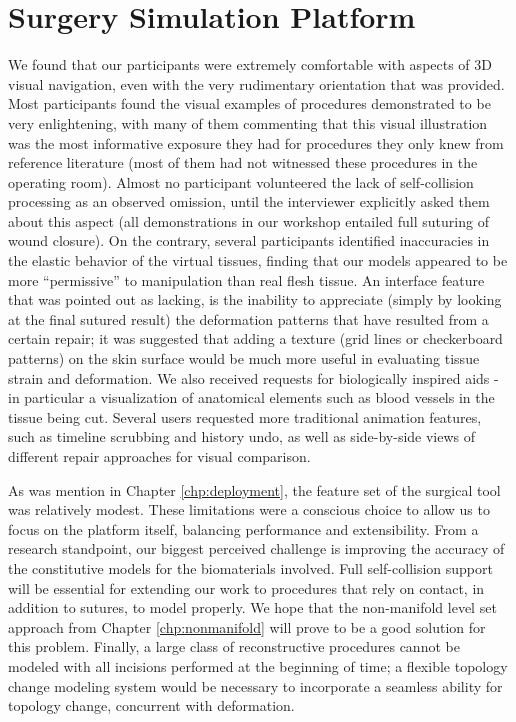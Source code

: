 \section{Surgery Simulation Platform}

We found that our participants were extremely comfortable with aspects
of 3D visual navigation, even with the very rudimentary orientation
that was provided. Most participants found the visual examples of
procedures demonstrated to be very enlightening, with many of them
commenting that this visual illustration was the most informative
exposure they had for procedures they only knew from reference
literature (most of them had not witnessed these procedures in the
operating room). Almost no participant volunteered the lack of
self-collision processing as an observed omission, until the
interviewer explicitly asked them about this aspect (all
demonstrations in our workshop entailed full suturing of wound
closure). On the contrary, several participants identified
inaccuracies in the elastic behavior of the virtual tissues, finding
that our models appeared to be more ``permissive'' to manipulation
than real flesh tissue. An interface feature that was pointed out as
lacking, is the inability to appreciate (simply by looking at the
final sutured result) the deformation patterns that have resulted from
a certain repair; it was suggested that adding a texture (grid lines
or checkerboard patterns) on the skin surface would be much more
useful in evaluating tissue strain and deformation. We also received
requests for biologically inspired aids - in particular a
visualization of anatomical elements such as blood vessels in the
tissue being cut. Several users requested more traditional animation
features, such as timeline scrubbing and history undo, as well as
side-by-side views of different repair approaches for visual
comparison.

As was mention in Chapter \ref{chp:deployment}, the feature set of the
surgical tool was relatively modest. These limitations were a
conscious choice to allow us to focus on the platform itself,
balancing performance and extensibility. From a research standpoint,
our biggest perceived challenge is improving the accuracy of the
constitutive models for the biomaterials involved. Full self-collision
support will be essential for extending our work to procedures that
rely on contact, in addition to sutures, to model properly. We hope
that the non-manifold level set approach from Chapter
\ref{chp:nonmanifold} will prove to be a good solution for this
problem. Finally, a large class of reconstructive procedures cannot be
modeled with all incisions performed at the beginning of time; a
flexible topology change modeling system would be necessary to
incorporate a seamless ability for topology change, concurrent with
deformation.

  





